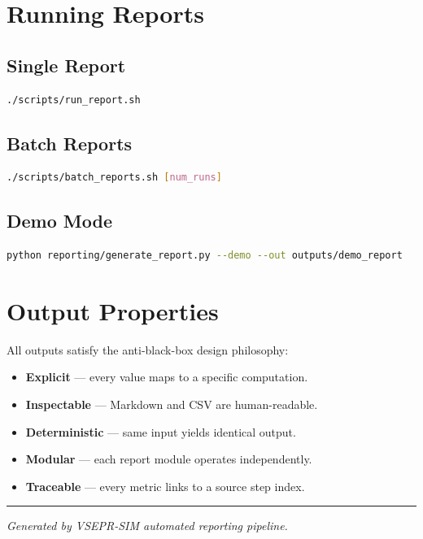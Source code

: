 \documentclass[11pt]{article}
\begin{document}
\section{Running Reports}

\subsection{Single Report}
\begin{lstlisting}[language=bash]
./scripts/run_report.sh
\end{lstlisting}

\subsection{Batch Reports}
\begin{lstlisting}[language=bash]
./scripts/batch_reports.sh [num_runs]
\end{lstlisting}

\subsection{Demo Mode}
\begin{lstlisting}[language=bash]
python reporting/generate_report.py --demo --out outputs/demo_report
\end{lstlisting}

\section{Output Properties}

All outputs satisfy the anti-black-box design philosophy:

\begin{itemize}
  \item \textbf{Explicit} --- every value maps to a specific computation.
  \item \textbf{Inspectable} --- Markdown and CSV are human-readable.
  \item \textbf{Deterministic} --- same input yields identical output.
  \item \textbf{Modular} --- each report module operates independently.
  \item \textbf{Traceable} --- every metric links to a source step index.
\end{itemize}

\vfill
\noindent\rule{\textwidth}{0.4pt}
\small\textit{Generated by VSEPR-SIM automated reporting pipeline.}
\end{document}
